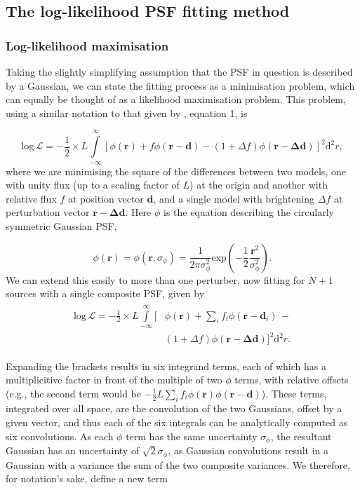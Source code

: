 \documentclass[fleqn,usenatbib]{mnras}
\begin{document}
\subsection{The log-likelihood PSF fitting method}
\subsubsection{Log-likelihood maximisation}
\label{sec:loglmax}
Taking the slightly simplifying assumption that the PSF in question is described by a Gaussian, we can state the fitting process as a minimisation problem, which can equally be thought of as a likelihood maximisation problem. This problem, using a similar notation to that given by \citet{2018MNRAS.476.4372}, equation 1, is

\begin{equation}
    \mathrm{log}\,\mathcal{L} = -\frac{1}{2}\times L \int\limits_{-\infty}^\infty\! \left[\phi(\mathbf{r}) + f\phi(\mathbf{r - d}) - (1 + \Delta f)\phi(\mathbf{r - \Delta d})\right]^2 \mathrm{d}^2r,
\label{eq:logL1}
\end{equation}
where we are minimising the square of the differences between two models, one with unity flux (up to a scaling factor of $L$) at the origin and another with relative flux $f$ at position vector $\mathbf{d}$, and a single model with brightening $\Delta f$ at perturbation vector $\mathbf{r - \Delta d}$. Here $\phi$ is the equation describing the circularly symmetric Gaussian PSF,

\begin{equation}
    \phi(\mathbf{r}) = \phi(\mathbf{r}, \sigma_\phi) = \frac{1}{2\pi \sigma_\phi^2}\mathrm{exp}\left(-\frac{1}{2} \frac{\mathbf{r}^2}{\sigma_\phi^2}\right).
\end{equation}
We can extend this easily to more than one perturber, now fitting for $N+1$ sources with a single composite PSF, given by
\begin{align}
\begin{split}
    \mathrm{log}\,\mathcal{L} = -\frac{1}{2}\times L \int\limits_{-\infty}^\infty\! \bigg[&\phi(\mathbf{r}) + \sum_i f_i\phi(\mathbf{r} - \mathbf{d}_i)\, - \\&(1 + \Delta f)\phi(\mathbf{r - \Delta d})\bigg]^2 \mathrm{d}^2r.
\label{eq:logL2}
\end{split}
\end{align}

Expanding the brackets results in six integrand terms, each of which has a multiplicitive factor in front of the multiple of two $\phi$ terms, with relative offsets (e.g., the second term would be $-\frac{1}{2}L\sum_i f_i\phi(\mathbf{r})\phi(\mathbf{r - d})$). These terms, integrated over all space, are the convolution of the two Gaussians, offset by a given vector, and thus each of the six integrals can be analytically computed as six convolutions. As each $\phi$ term has the same uncertainty $\sigma_\phi$, the resultant Gaussian has an uncertainty of $\sqrt{2}\sigma_\phi$, as Gaussian convolutions result in a Gaussian with a variance the sum of the two composite variances. We therefore, for notation's sake, define a new term
\end{document}
